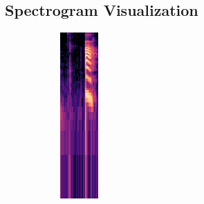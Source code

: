 \subsection{Spectrogram Visualization}
\label{subsec:spectrogram-visualization}

\begin{figure}[htbp]
    \centering
    \begin{subfigure}[b]{0.19\textwidth}
        \includegraphics[width=\textwidth]{res/images/model/A.png}

\end{subfigure}
\end{figure}
